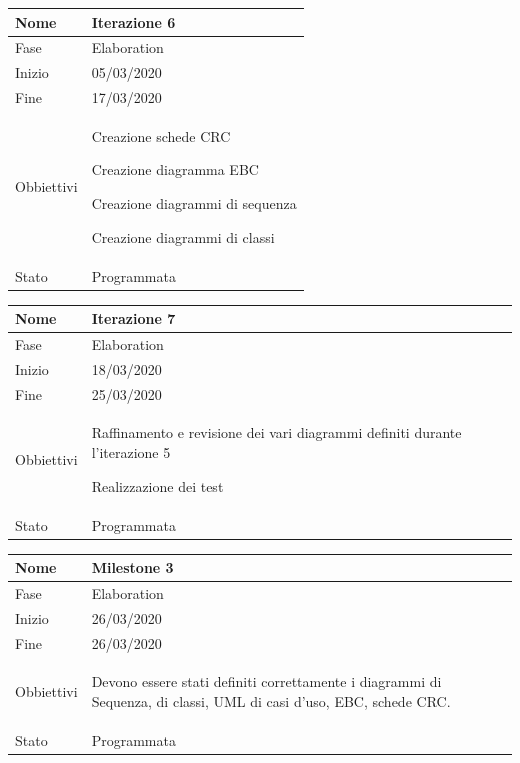 \begin{center}
\begin{tabular}{ |p{2cm}|p{10cm}|  }
\hline
Nome & Iterazione 6 \\\hline
Fase & Elaboration \\\hline
Inizio & 05/03/2020 \\\hline
Fine &  17/03/2020  \\\hline
Obbiettivi & 
	\begin{compactitem}
		\item Creazione schede CRC
		\item Creazione diagramma EBC
		\item Creazione diagrammi di sequenza
		\item Creazione diagrammi di classi
	\end{compactitem}\\\hline
Stato &  Programmata \\\hline
\end{tabular}
\label{table:6}\newline

\begin{tabular}{ |p{2cm}|p{10cm}|  }
\hline
Nome & Iterazione 7 \\\hline
Fase & Elaboration \\\hline
Inizio & 18/03/2020 \\\hline
Fine & 25/03/2020 \\\hline
Obbiettivi & 
	\begin{compactitem}
		\item Raffinamento e revisione dei vari diagrammi definiti durante l'iterazione 5
		\item Realizzazione dei test
	\end{compactitem}\\\hline
Stato &  Programmata \\\hline
\end{tabular}
\label{table:7}\newline

\begin{tabular}{ |p{2cm}|p{10cm}|  }
\hline
Nome & Milestone 3\\\hline
Fase & Elaboration \\\hline
Inizio & 26/03/2020 \\\hline
Fine &  26/03/2020 \\\hline
Obbiettivi & 
	\begin{compactitem}
		\item Devono essere stati definiti correttamente i diagrammi di Sequenza, di classi, UML di casi d'uso, EBC, schede CRC.
	\end{compactitem}\\\hline
Stato &  Programmata \\\hline
\end{tabular}
\label{table:milestone3}\newline


\end{center}
